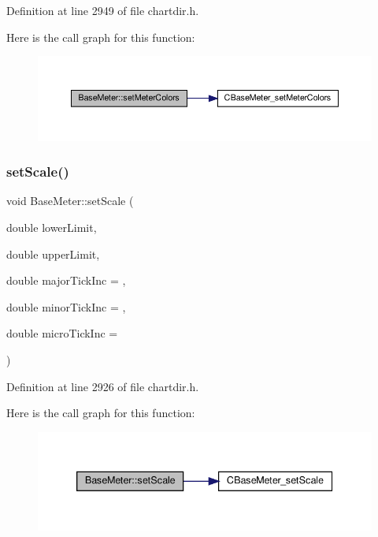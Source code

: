 Definition at line 2949 of file chartdir.\+h.

Here is the call graph for this function\+:
\nopagebreak
\begin{figure}[H]
\begin{center}
\leavevmode
\includegraphics[width=350pt]{class_base_meter_ab84e7d42596803b75cd15bd721ae96f1_cgraph}
\end{center}
\end{figure}
\mbox{\label{class_base_meter_a60d236ad098cbca9b689bd7b42b35bd2}} 
\subsubsection{\texorpdfstring{set\+Scale()}{setScale()}\hspace{0.1cm}{\footnotesize\ttfamily [1/3]}}
{\footnotesize\ttfamily void Base\+Meter\+::set\+Scale (\begin{DoxyParamCaption}\item[{double}]{lower\+Limit,  }\item[{double}]{upper\+Limit,  }\item[{double}]{major\+Tick\+Inc = {},  }\item[{double}]{minor\+Tick\+Inc = {},  }\item[{double}]{micro\+Tick\+Inc = {} }\end{DoxyParamCaption})\hspace{0.3cm}{\ttfamily [inline]}}



Definition at line 2926 of file chartdir.\+h.

Here is the call graph for this function\+:
\nopagebreak
\begin{figure}[H]
\begin{center}
\leavevmode
\includegraphics[width=339pt]{class_base_meter_a60d236ad098cbca9b689bd7b42b35bd2_cgraph}
\end{center}
\end{figure}
\mbox{\label{class_base_meter_a8b3b33dbe680f892ba3d860b579e727f}} 
